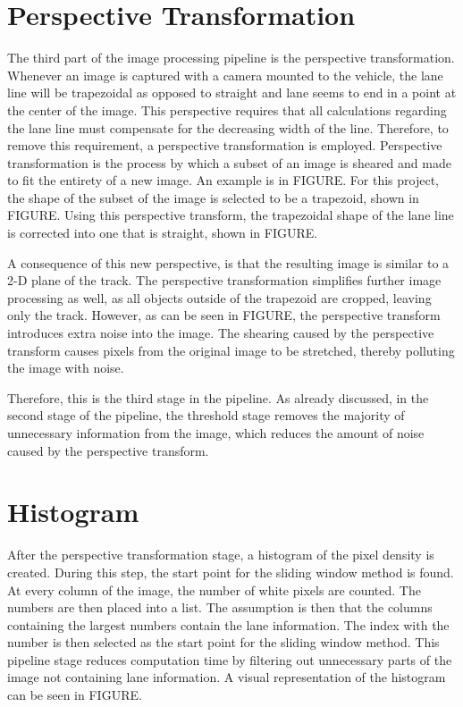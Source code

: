 \documentclass[arbeit=studie,oneside,BCOR=12mm]{ArbeitRST}
\begin{document}
\section{Perspective Transformation}
The third part of the image processing pipeline is the perspective 
transformation. 
Whenever an image is captured with a camera mounted to the vehicle, the lane 
line will be trapezoidal as opposed to straight and lane seems to end in a 
point at the center of the image. This perspective requires that all 
calculations 
regarding the lane line must compensate for the decreasing width of the line. 
Therefore, to remove this requirement, a perspective transformation is 
employed. Perspective transformation is the process 
by which a subset of an image is sheared and made to fit the entirety of a new 
image. An example is in FIGURE. For this project, the shape of the subset of 
the 
image is selected to be a trapezoid, shown in FIGURE. 
Using this perspective transform, the trapezoidal shape of the lane line is 
corrected 
into one that is straight, shown in FIGURE.

A consequence of this new perspective, is that the resulting 
image is similar to a 2-D plane of the track. The perspective transformation 
simplifies further image processing as well, as all objects outside of the 
trapezoid 
are cropped, leaving only the track. However, as can be seen in FIGURE, the 
perspective transform introduces extra noise into the image. The shearing 
caused by the perspective transform causes pixels from the original image to 
be stretched, thereby polluting the image with noise. 

Therefore, this is the third stage in the pipeline. As already discussed, in 
the second stage of the pipeline, the threshold stage removes the majority of 
unnecessary information from the image, which reduces the amount of noise 
caused by the perspective transform.

\section{Histogram}
After the perspective transformation stage, a histogram of the pixel density 
is created. During this step, the start point for the sliding window method is
found. 
At every column of the image, the number of white pixels are counted. 
The numbers are then placed into a list. The assumption is then that the 
columns containing the largest numbers contain the lane information. The 
index with the number is then selected as the start point for the sliding 
window method. This pipeline stage reduces computation time by filtering out 
unnecessary parts of the image not containing lane information. A visual 
representation of the histogram can be seen in FIGURE.
\end{document}
